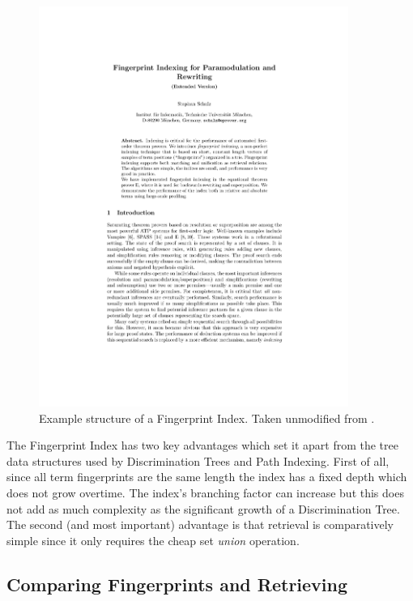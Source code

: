 \begin{figure}[H]
  \centering
  \includegraphics[page=7,width=0.9\textwidth,trim=5cm 14.3cm 4.8cm 4.5cm,clip]{resources/schulz}
  \caption
   {Example structure of a Fingerprint Index. Taken unmodified from \protect\cite[p7]{shulz12}.}
   \label{fig:fpindex}
\end{figure}

The Fingerprint Index has two key advantages which set it apart from the tree data
structures used by Discrimination Trees and Path Indexing. First of all, since all
term fingerprints are the same length the index has a fixed depth which does not grow overtime. The index's branching
factor can increase but this does not add as much complexity as the significant growth
of a Discrimination Tree. The second (and most important) advantage is that
retrieval is comparatively simple since it only requires the cheap set \emph{union} operation.

\subsection{Comparing Fingerprints and Retrieving}


